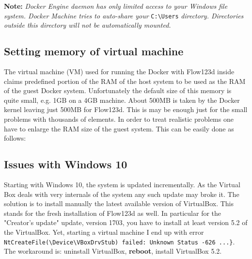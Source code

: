 \documentclass[12pt,a4paper]{report}
\begin{document}
\textbf{Note:}
\textit{Docker Engine daemon has only limited access to your Windows file system. Docker Machine tries to auto-share your}
\verb'C:\Users' \textit{directory. Directories outside this directory will not be automatically mounted.} 

\subsection{Setting memory of virtual machine}
The virtual machine (VM) used for running the Docker with Flow123d inside claims predefined portion of the RAM 
of the host system to be used as the RAM of the guest Docker system. Unfortunately the default size of this memory is
quite small, e.g. 1GB on a 4GB machine. About 500MB is taken by the Docker kernel leaving just 500MB for Flow123d.
This is may be enough just for the small problems with thousands of elements. In order to treat realistic problems one have to 
enlarge the RAM size of the guest system. This can be easily done as follows:

\subsection{Issues with Windows 10}
Starting with Windows 10, the system is updated incrementally. As the Virtual Box deals with very internals of the system
any such update may broke it. The solution is to install manually the latest available version of VirtualBox. This stands for the 
fresh installation of Flow123d as well. In particular for the "Creator's update" update, version 1703, you have to install at least version 5.2 
of the VirtualBox. Yet, starting a virtual machine I end up with error \verb'NtCreateFile(\Device\VBoxDrvStub) failed: Unknown Status -626 ...}'. The workaround is:
uninstall VirtualBox, {\bf reboot}, install VirtualBox 5.2.  
\end{document}
